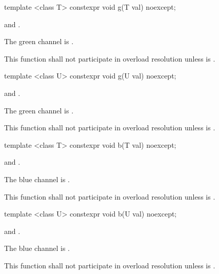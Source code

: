 %
\begin{itemdecl}
template <class T>
constexpr void g(T val) noexcept;
\end{itemdecl}

\begin{itemdescr}
\pnum
\requires
{} and .

\pnum
\effects
The green channel is .

\pnum
\remarks
This function shall not participate in overload resolution unless  is .
\end{itemdescr}

%
\begin{itemdecl}
template <class U>
constexpr void g(U val) noexcept;
\end{itemdecl}
\begin{itemdescr}
\pnum
\requires
{} and .

\pnum
\effects
The green channel is .

\pnum
\remarks
This function shall not participate in overload resolution unless  is .
\end{itemdescr}

%
\begin{itemdecl}
template <class T>
constexpr void b(T val) noexcept;
\end{itemdecl}
\begin{itemdescr}
\pnum
\requires
{} and .

\pnum
\effects
The blue channel is .

\pnum
\remarks
This function shall not participate in overload resolution unless  is .
\end{itemdescr}

%
\begin{itemdecl}
template <class U>
constexpr void b(U val) noexcept;
\end{itemdecl}
\begin{itemdescr}
\pnum
\requires
{} and .

\pnum
\effects
The blue channel is .

\pnum
\remarks
This function shall not participate in overload resolution unless  is .
\end{itemdescr}


